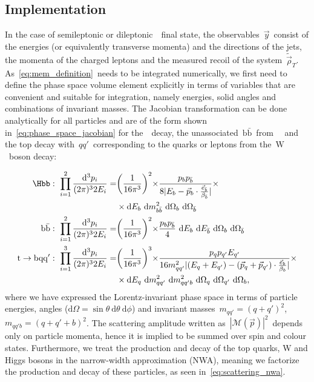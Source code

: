 \subsection{Implementation}
\label{sec:mem_implementation}
In the case of semileptonic or dileptonic~\ttH~final state, the observables~$\vec{y}$~consist of the energies (or equivalently transverse momenta) and the directions of the jets, the momenta of the charged leptons and the measured recoil of the system~$\tilde{\vec{\rho}}_T$. As~\cref{eq:mem_definition}~needs to be integrated numerically, we first need to define the phase space volume element explicitly in terms of variables that are convenient and suitable for integration, namely energies, solid angles and combinations of invariant masses. The Jacobian transformation can be done analytically for all particles and are of the form shown in~\cref{eq:phase_space_jacobian} for the~\Hbb~decay, the unassociated~$\mathrm{b}\bar{\mathrm{b}}$~from~\ttbb~ and the top decay with~$qq'$~corresponding to the quarks or leptons from the~$\mathrm{W}$~boson decay:

\begin{align}
\label{eq:phase_space_jacobian}
\Hbb:\ \prod_{i=1}^{2} \frac{\mathrm{d}^3 p_i}{(2\pi)^3 2 E_i} =& \biggr(\frac{1}{16 \pi^3}\biggl)^2 \times \frac{p_b p_{\bar{b}}}{8 |E_b - \vec{p}_b \cdot \frac{\vec{e}_{\bar{b}}}{\beta_{\bar{b}}}|} \times \\
&\times\mathrm{d}E_{b}~\mathrm{d}m^2_{b\bar{b}}~\mathrm{d}\Omega_{b}~\mathrm{d}\Omega_{\bar{b}} \\
\mathrm{b}\bar{\mathrm{b}}:\ \prod_{i=1}^{2} \frac{\mathrm{d}^3 p_i}{(2\pi)^3 2 E_i} =& \biggr(\frac{1}{16 \pi^3}\biggl)^2 \times \frac{p_b p_{\bar{b}}}{4}~\mathrm{d}E_{b}~\mathrm{d}E_{\bar{b}}~\mathrm{d}\Omega_{b}~\mathrm{d}\Omega_{\bar{b}} \\
\mathrm{t} \rightarrow \mathrm{b}\mathrm{q}\mathrm{q}':\ \prod_{i=1}^{3} \frac{\mathrm{d}^3 p_i}{(2\pi)^3 2 E_i} =& \biggr(\frac{1}{16 \pi^3}\biggl)^3 \times \frac{p_q p_{q'} E_{q'}}{16 m_{qq'}^2 |(E_q + E_{q'}) - (\vec{p}_q + \vec{p}_{q'})\cdot \frac{\vec{e}_b}{\beta_b}|}\times\\
&\times\mathrm{d}E_{q}~\mathrm{d}m^2_{qq'}~\mathrm{d}m^2_{qq'b}~\mathrm{d}\Omega_{q}~\mathrm{d}\Omega_{q'}~\mathrm{d}\Omega_b,
\end{align}
where we have expressed the Lorentz-invariant phase space in terms of particle energies, angles ($\mathrm{d}\Omega = \sin{\theta}~\mathrm{d}\theta~\mathrm{d}\phi$) and invariant masses~$m_{qq'} = (q+q')^2$,~$m_{qq'b} = (q + q' + b)^2$.
The scattering amplitude written as~$|\mathcal{M}(\vec{p})|^2$~depends only on particle momenta, hence it is implied to be summed over spin and colour states. Furthermore, we treat the production and decay of the top quarks, W and Higgs bosons in the narrow-width approximation (NWA), meaning we factorize the production and decay of these particles, as seen in~\cref{eq:scattering_nwa}.

